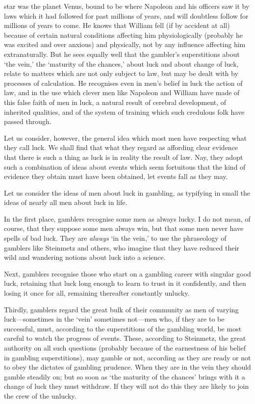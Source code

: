 \documentclass[letterpaper,12pt,oneside,openany]{memoir}
\begin{document}
star was the planet Venus, bound to be where
Napoleon and his officers saw it by laws which it had
followed for past millions of years, and will doubtless
follow for millions of years to come. He knows that
William fell (if by accident at all) because of certain
natural conditions affecting him physiologically (probably
he was excited and over anxious) and physically,
not by any influence affecting him extranaturally. But
he sees equally well that the gambler's superstitions
about `the vein,' the `maturity of the chances,' about
luck and about change of luck, relate to matters which
are not only subject to law, but may be dealt with by
processes of calculation. He recognises even in men's
belief in luck the action of law, and in the use which
clever men like Napoleon and William have made of
this false faith of men in luck, a natural result of cerebral
development, of inherited qualities, and of the system
of training which such credulous folk have passed
through.

Let us consider, however, the general idea which
most men have respecting what they call luck. We
shall find that what they regard as affording clear evidence
that there is such a thing as luck is in reality
the result of law. Nay, they adopt such a combination
of ideas about events which seem fortuitous that the
kind of evidence they obtain must have been obtained,
let events fall as they may.

Let us consider the ideas of men about luck in
gambling, as typifying in small the ideas of nearly all
men about luck in life.

In the first place, gamblers recognise some men as
always lucky. I do not mean, of course, that they suppose
some men always win, but that some men never
have spells of bad luck. They are \textit{always} `in the vein,'
to use the phraseology of gamblers like Steinmetz and
others, who imagine that they have reduced their wild
and wandering notions about luck into a science.

Next, gamblers recognise those who start on a
gambling career with singular good luck, retaining that
luck long enough to learn to trust in it confidently, and
then losing it once for all, remaining thereafter constantly
unlucky.

Thirdly, gamblers regard the great bulk of their community
as men of varying luck---sometimes in the
`vein' sometimes not---men who, if they are to be
successful, must, according to the superstitions of the
gambling world, be most careful to watch the progress
of events. These, according to Steinmetz, the great
authority on all such questions (probably because of the
earnestness of his belief in gambling superstitions), may
gamble or not, according as they are ready or not to
obey the dictates of gambling prudence. When they
are in the vein they should gamble steadily on; but so
soon as `the maturity of the chances' brings with it a
change of luck they must withdraw. If they will not
do this they are likely to join the crew of the unlucky.
\end{document}
